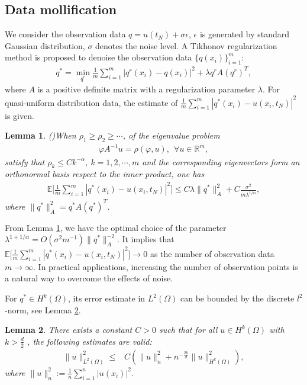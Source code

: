 \documentclass[11pt]{article}
\newtheorem{lemma}{Lemma}[section]
\numberwithin{equation}{section}
\begin{document}
\subsection{Data mollification}\label{data-moli}
We consider the observation data $q=u(t_N)+\sigma \epsilon$, $\epsilon$ is generated by standard Gaussian distribution, $\sigma$ denotes the noise level. 
A Tikhonov regularization method is proposed to denoise the observation data $\{q(x_i)\}_{i=1}^m$:
\begin{align*}
q^*=\min\limits_{q^r}\frac{1}{m}\sum_{i=1}^m|q^r(x_i)-q(x_i)|^2+\lambda q^rA(q^r)^T,    
\end{align*}
where $A$ is a positive definite matrix with a regularization parameter $\lambda$. For quasi-uniform distribution data, the estimate of $\frac{1}{m}\sum_{i=1}^m|q^*(x_i)-u(x_i,t_N)|^2$ is given. 
\begin{lemma}(\cite{CenZhang:2025})\label{data-denoise}
When $\rho_1\geq\rho_2\geq\cdots$, of the eigenvalue problem
\begin{align*}
\varphi A^{-1}u=\rho(\varphi,u),~~\forall u\in \mathbb{R}^m,    
\end{align*}
satisfy that $\rho_k\leq Ck^{-\alpha}$, $k=1,2,\cdots,m$ and the corresponding eigenvectors form an orthonormal basis respect to the inner product, one has
\begin{align*}
\mathbb{E}\big[\frac{1}{m}\sum_{i=1}^m|q^*(x_i)-u(x_i,t_N)|^2\big]\leq C\lambda\|q^*\|_{A}^2+C\frac{\sigma^2}{m\lambda^{1/\alpha}},
\end{align*}
where $\|q^*\|_{A}^2=q^*A(q^*)^T$.
\end{lemma}

From Lemma \ref{data-denoise}, we have the optimal choice of the parameter $\lambda^{1+1/\alpha}=O(\sigma^2m^{-1})\|q^*\|_A^{-2}$. It implies that $\mathbb{E}\big[\frac{1}{m}\sum_{i=1}^m|q^*(x_i)-u(x_i,t_N)|^2\big]\rightarrow0$ as the number of observation data $m\rightarrow \infty$. In practical applications, increasing the number of observation points is a natural way to overcome the effects of noise.

For $q^*\in H^k(\Omega)$, its error estimate in $L^2(\Omega)$ can be bounded by the discrete $l^2$-norm, see Lemma \ref{lem-u-un}.
\begin{lemma}\cite[Theorems 3.3 and 3.4]{utreras1988convergence}
\label{lem-u-un}
There exists a constant  $C>0$  such that for all  $  u \in H^k(\Omega)$ with $k>\frac{d}2$ , the following estimates are valid:
\begin{equation*}
\begin{aligned}
\| u \|^2_{L^2(\Omega)} \leq& C \left( \| u \|^2_n + n^{-\frac{2k}{d}} \| u \|^2_{H^k(\Omega)} \right),
\end{aligned}
\end{equation*}
where $\| u \|^2_n:=\frac{1}{n}\sum_{i=1}^n|u(x_i)|^2$.
\end{lemma}
\end{document}
